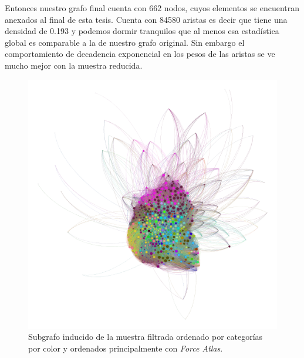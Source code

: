 Entonces nuestro grafo final cuenta con 662 nodos, cuyos elementos se encuentran anexados al final de esta tesis. Cuenta con 84580 aristas es decir que tiene una densidad de 0.193 y podemos dormir tranquilos que al menos esa estadística global es comparable a la de nuestro grafo original. Sin embargo el comportamiento de decadencia exponencial en los pesos de las aristas se ve mucho mejor con la muestra reducida.

\begin{figure}[!ht]
\includegraphics[width=1\textwidth]{Tesis/Figures/LotameFullgraphAmazing.png}
\caption{Subgrafo inducido de la muestra filtrada ordenado por categorías por color y ordenados principalmente con \textit{Force Atlas}.}
\centering
\end{figure}

